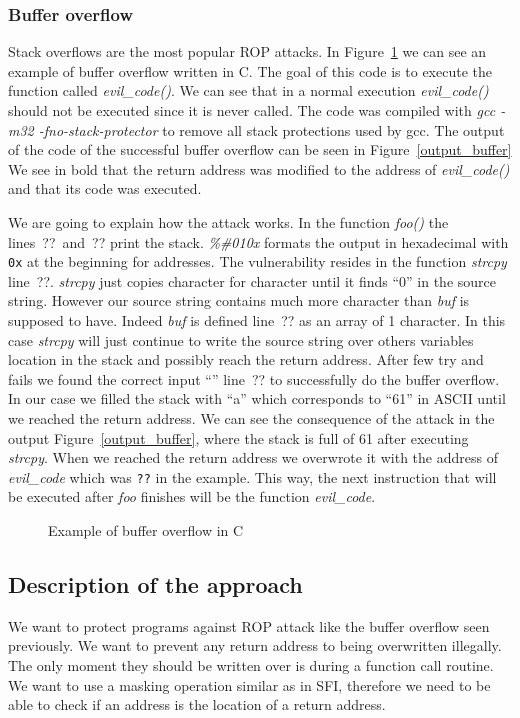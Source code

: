 \documentclass[11pt]{sdm}
\begin{document}
\subsubsection{Buffer overflow}
\label{ssub:Buffer overflow}

Stack overflows are the most popular ROP attacks. In Figure~\ref{buffer_overflow_code} we can see an example of buffer overflow written in C.
The goal of this code is to execute the function called \textit{evil\_code()}. We can see that in a normal execution \textit{evil\_code()} should not be executed since it is never called.
The code was compiled with \textit{gcc -m32 -fno-stack-protector} to remove all stack protections used by gcc. The output of the code of the successful buffer overflow can be seen in Figure~\ref{output_buffer}
We see in bold that the return address was modified to the address of \textit{evil\_code()} and that its code was executed.

We are going to explain how the attack works. In the function \textit{foo()} the lines~??~and~?? print the stack. \textit{\%\#010x} formats the output in hexadecimal with \texttt{0x} at the beginning for addresses.
The vulnerability resides in the function \textit{strcpy} line~??. \textit{strcpy} just copies character for character until it finds ``0'' in the source string. However our source string contains much more character than \textit{buf} is supposed to have. 
Indeed \textit{buf} is defined line~?? as an array of 1 character.
In this case \textit{strcpy} will just continue to write the source string over others variables location in the stack and possibly reach the return address.
After few try and fails we found the correct input ``'' line~?? to successfully do the buffer overflow.
In our case we filled the stack with ``a'' which corresponds to ``61'' in ASCII until we reached the return address.
We can see the consequence of the attack in the output Figure~\ref{output_buffer}, where the stack is full of 61 after executing \textit{strcpy}.
When we reached the return address we overwrote it with the address of \textit{evil\_code} which was \texttt{??} in the example.
This way, the next instruction that will be executed after \textit{foo} finishes will be the function \textit{evil\_code}.

\begin{figure}

\centering
\caption{Example of buffer overflow in C}
\label{buffer_overflow_code}
\end{figure}

\subsection{Description of the approach}
\label{sub:Description of the approach}
	We want to protect programs against ROP attack like the buffer overflow seen previously. We want to prevent any return address to being overwritten illegally. The only moment they should be written over is during a function call routine.
We want to use a masking operation similar as in SFI, therefore we need to be able to check if an address is the location of a return address. 
\end{document}
